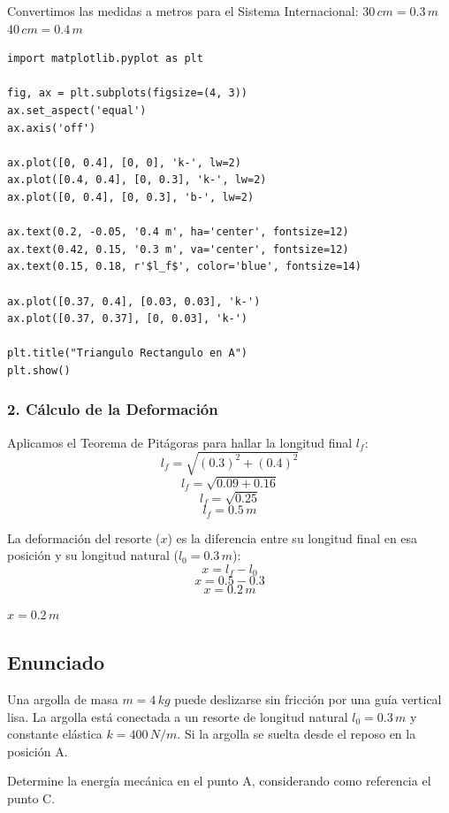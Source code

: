 \documentclass[12pt, a4paper]{article}
\begin{document}
Convertimos las medidas a metros para el Sistema Internacional:
$30 \, \si{cm} = 0.3 \, \si{m}$
$40 \, \si{cm} = 0.4 \, \si{m}$

\begin{lstlisting}
import matplotlib.pyplot as plt

fig, ax = plt.subplots(figsize=(4, 3))
ax.set_aspect('equal')
ax.axis('off')

ax.plot([0, 0.4], [0, 0], 'k-', lw=2)
ax.plot([0.4, 0.4], [0, 0.3], 'k-', lw=2)
ax.plot([0, 0.4], [0, 0.3], 'b-', lw=2)

ax.text(0.2, -0.05, '0.4 m', ha='center', fontsize=12)
ax.text(0.42, 0.15, '0.3 m', va='center', fontsize=12)
ax.text(0.15, 0.18, r'$l_f$', color='blue', fontsize=14)

ax.plot([0.37, 0.4], [0.03, 0.03], 'k-')
ax.plot([0.37, 0.37], [0, 0.03], 'k-')

plt.title("Triangulo Rectangulo en A")
plt.show()
\end{lstlisting}

\subsubsection*{2. Cálculo de la Deformación}
Aplicamos el Teorema de Pitágoras para hallar la longitud final $l_f$:
$$ l_f = \sqrt{(0.3)^2 + (0.4)^2} $$
$$ l_f = \sqrt{0.09 + 0.16} $$
$$ l_f = \sqrt{0.25} $$
$$ l_f = 0.5 \, \si{m} $$

La deformación del resorte ($x$) es la diferencia entre su longitud final en esa posición y su longitud natural ($l_0 = 0.3 \, \si{m}$):
$$ x = l_f - l_0 $$
$$ x = 0.5 - 0.3 $$
$$ x = 0.2 \, \si{m} $$

\begin{tcolorbox}[colback=green!5!white, colframe=green!50!black, title=Respuesta Final]
\centering \Large $x = 0.2 \, \si{m}$
\end{tcolorbox}

\newpage

\subsection*{Enunciado}
Una argolla de masa $m = 4 \, \si{kg}$ puede deslizarse sin fricción por una guía vertical lisa. La argolla está conectada a un resorte de longitud natural $l_0 = 0.3 \, \si{m}$ y constante elástica $k = 400 \, \si{N/m}$. Si la argolla se suelta desde el reposo en la posición A. 

Determine la energía mecánica en el punto A, considerando como referencia el punto C.
\end{document}
